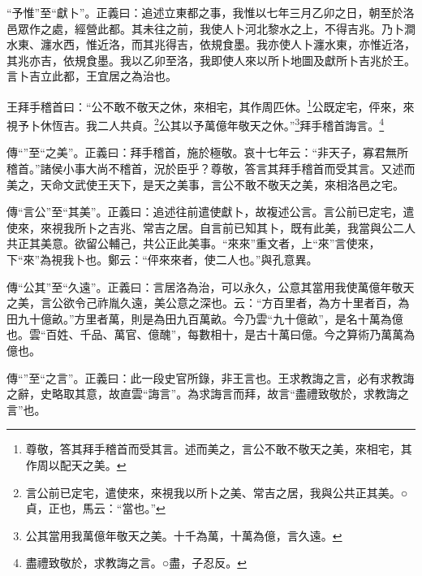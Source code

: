 {\noindent\shu{}\fzkt “予惟”至“獻卜”。正義曰：追述立東都之事，我惟以七年三月乙卯之日，朝至於洛邑眾作之處，經營此都。其未往之前，我使人卜河北黎水之上，不得吉兆。乃卜澗水東、瀍水西，惟近洛，而其兆得吉，依規食墨。我亦使人卜瀍水東，亦惟近洛，其兆亦吉，依規食墨。我以乙卯至洛，我即使人來以所卜地圖及獻所卜吉兆於王。言卜吉立此都，王宜居之為治也。 \par}

王拜手稽首曰：“公不敢不敬天之休，來相宅，其作周匹休。\footnote{尊敬，答其拜手稽首而受其言。述而美之，言公不敢不敬天之美，來相宅，其作周以配天之美。}公既定宅，伻來，來視予卜休恆吉。我二人共貞。\footnote{言公前已定宅，遣使來，來視我以所卜之美、常吉之居，我與公共正其美。○貞，正也，馬云：“當也。”}公其以予萬億年敬天之休。”\footnote{公其當用我萬億年敬天之美。十千為萬，十萬為億，言久遠。}拜手稽首誨言。\footnote{盡禮致敬於，求教誨之言。○盡，子忍反。}


{\noindent\zhuan{}\fzbyks 傳“”至“之美”。正義曰：拜手稽首，施於極敬。哀十七年云：“非天子，寡君無所稽首。”諸侯小事大尚不稽首，況於臣乎？尊敬，答言其拜手稽首而受其言。又述而美之，天命文武使王天下，是天之美事，言公不敢不敬天之美，來相洛邑之宅。 \par}

{\noindent\zhuan{}\fzbyks 傳“言公”至“其美”。正義曰：追述往前遣使獻卜，故複述公言。言公前已定宅，遣使來，來視我所卜之吉兆、常吉之居。自言前已知其卜，既有此美，我當與公二人共正其美意。欲留公輔己，共公正此美事。“來來”重文者，上“來”言使來，下“來”為視我卜也。鄭云：“伻來來者，使二人也。”與孔意異。 \par}

{\noindent\zhuan{}\fzbyks 傳“公其”至“久遠”。正義曰：言居洛為治，可以永久，公意其當用我使萬億年敬天之美，言公欲令己祚胤久遠，美公意之深也。云：“方百里者，為方十里者百，為田九十億畝。”方里者萬，則是為田九百萬畝。今乃雲“九十億畝”，是名十萬為億也。雲“百姓、千品、萬官、億醜”，每數相十，是古十萬曰億。今之算術乃萬萬為億也。 \par}

{\noindent\zhuan{}\fzbyks 傳“”至“之言”。正義曰：此一段史官所錄，非王言也。王求教誨之言，必有求教誨之辭，史略取其意，故直雲“誨言”。為求誨言而拜，故言“盡禮致敬於，求教誨之言”也。 \par}


